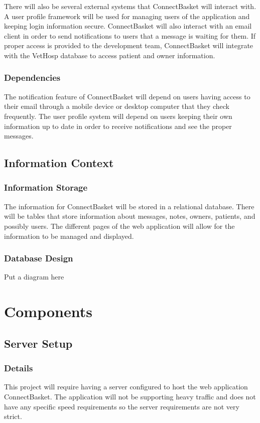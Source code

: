 \documentclass[onecolumn, draftclsnofoot,10pt, compsoc]{IEEEtran}
\begin{document}
There will also be several external systems that ConnectBasket will interact with. A user profile framework will be used for managing users of the application and keeping login information secure. ConnectBasket will also interact with an email client in order to send notifications to users that a message is waiting for them. If proper access is provided to the development team, ConnectBasket will integrate with the VetHosp database to access patient and owner information.

\subsubsection{Dependencies}
The notification feature of ConnectBasket will depend on users having access to their email through a mobile device or desktop computer that they check frequently. The user profile system will depend on users keeping their own information up to date in order to receive notifications and see the proper messages.

\subsection{Information Context}

\subsubsection{Information Storage}
The information for ConnectBasket will be stored in a relational database. There will be tables that store information about messages, notes, owners, patients, and possibly users.  The different pages of the web application will allow for the information to be managed and displayed.

\subsubsection{Database Design}
Put a diagram here



\section{Components}

\subsection{Server Setup}

\subsubsection{Details}
This project will require having a server configured to host the web application ConnectBasket. The application will not be supporting heavy traffic and does not have any specific speed requirements so the server requirements are not very strict.
\end{document}
